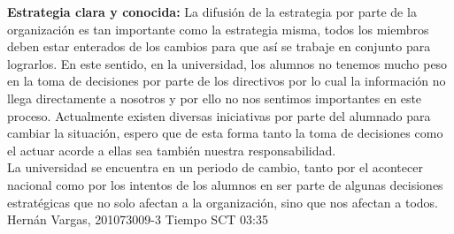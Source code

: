 \documentclass[spanish, fleqn]{article}
\begin{document}
	\thispagestyle{fancy}
	\textbf{Estrategia clara y conocida:} La difusión de la estrategia por parte
	de la organización es tan importante como la estrategia misma, todos los
	miembros deben estar enterados de los cambios para que así se trabaje en
	conjunto para lograrlos. En este sentido, en la universidad, los alumnos no
	tenemos mucho peso en la toma de decisiones por parte de los directivos por
	lo cual la información no llega directamente a nosotros y por ello no nos 
	sentimos importantes en este proceso. Actualmente existen diversas iniciativas
	por parte del alumnado para cambiar la situación, espero que de esta forma 
	tanto la toma de decisiones como el actuar acorde a ellas sea también nuestra
	responsabilidad.\\
	La universidad se encuentra en un periodo de cambio, tanto por el acontecer
	nacional como por los intentos de los alumnos en ser parte de algunas decisiones
	estratégicas que no solo afectan a la organización, sino que nos afectan a todos.
	\\[6cm]

	\vfil
	Hernán Vargas, 201073009-3 \hfill Tiempo SCT 03:35
\end{document}

